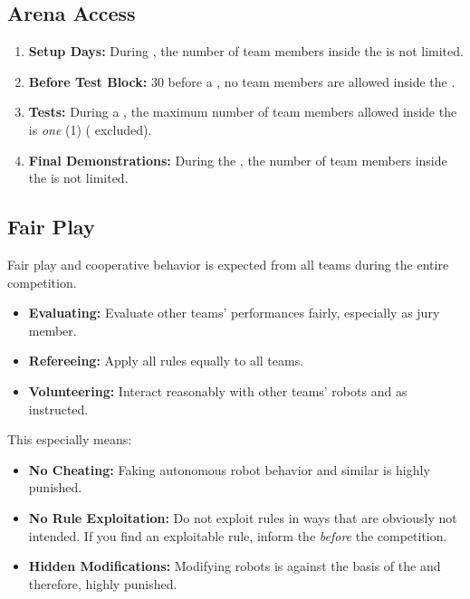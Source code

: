 \subsection{Arena Access}
\label{sec:rules:arenaaccess}
\begin{enumerate}
	\item \textbf{Setup Days:} During \SetupDays{}, the number of team members inside the \Arena{} is not limited.
	\item \textbf{Before Test Block:} \SI{30}{\min} before a \Testblock{}, no team members are allowed inside the \Arena{}.
	\item \textbf{Tests:} During a \Testslot{}, the maximum number of team members allowed inside the \Arena{} is \emph{one} (1) (\Volunteers{} excluded).
	\item \textbf{Final Demonstrations:} During the \FINAL{}, the number of team members inside the \Arena{} is not limited.
\end{enumerate}


\subsection{Fair Play}
\label{sec:rules:fairplay}
Fair play and cooperative behavior is expected from all teams during the entire competition.
\begin{itemize}
	\item \textbf{Evaluating:} Evaluate other teams' performances fairly, especially as jury member.
	\item \textbf{Refereeing:} Apply all rules equally to all teams.
	\item \textbf{Volunteering:} Interact reasonably with other teams' robots and as instructed.
\end{itemize}
This especially means:
\begin{itemize}
	\item \textbf{No Cheating:} Faking autonomous robot behavior and similar is highly punished. 
	\item \textbf{No Rule Exploitation:} Do not exploit rules in ways that are obviously not intended. If you find an exploitable rule, inform the \TC{} \emph{before}  the competition.
	\item \textbf{Hidden Modifications:} Modifying robots is against the basis of the \SPLs{} and therefore, highly punished.
\end{itemize}


